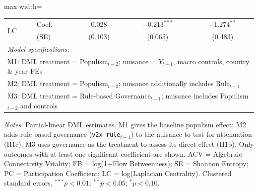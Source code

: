 \begin{table}[!htbp]
\begin{adjustbox}{max width=\textwidth}
\begin{tabular}{llccc}
\multirow{2}{*}{LC} & Coef. & 0.028 & $-0.213^{***}$ & $-1.274^{**}$ \\
& (SE) & (0.103) & (0.065) & (0.483) \\[3pt]

\midrule
\multicolumn{5}{l}{\textit{Model specifications:}} \\
\multicolumn{5}{l}{M1: DML treatment = Populism$_{t-2}$; nuisance = $Y_{t-1}$, macro controls, country \& year FEs} \\
\multicolumn{5}{l}{M2: DML treatment = Populism$_{t-2}$; nuisance additionally includes Rule$_{t-1}$} \\
\multicolumn{5}{l}{M3: DML treatment = Rule-based Governance$_{t-1}$; nuisance includes Populism$_{t-2}$ and controls} \\

\bottomrule
\end{tabular}
\end{adjustbox}
\vspace{4pt}
\begin{minipage}{\textwidth}
\footnotesize
\textit{Notes}: Partial-linear DML estimates. M1 gives the baseline populism effect; M2 adds rule-based governance (\texttt{v2x\_rule}$_{t-1}$) to the nuisance to test for attenuation (H1c); M3 uses governance as the treatment to assess its direct effect (H1b). Only outcomes with at least one significant coefficient are shown. ACV = Algebraic Connectivity Vitality; FB = log(1+Flow Betweenness); SE = Shannon Entropy; PC = Participation Coefficient; LC = log(Laplacian Centrality). Clustered standard errors. $^{***}p<0.01$; $^{**}p<0.05$; $^{*}p<0.10$.
\end{minipage}
\end{table}
